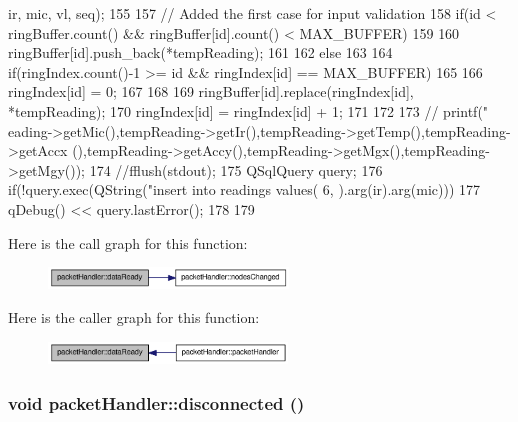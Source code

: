 \begin{DoxyCode}
{      ir, mic, vl, seq);
155 
157       // Added the first case for input validation
158       if(id < ringBuffer.count() && ringBuffer[id].count() < MAX_BUFFER)
159       {
160         ringBuffer[id].push_back(*tempReading);
161       }
162       else
163       {
164         if(ringIndex.count()-1 >= id && ringIndex[id] == MAX_BUFFER)
165           {
166               ringIndex[id] = 0;
167           }
168 
169           ringBuffer[id].replace(ringIndex[id], *tempReading);
170           ringIndex[id] = ringIndex[id] + 1;
171       }
172 
173 //      printf("%
      eading->getMic(),tempReading->getIr(),tempReading->getTemp(),tempReading->getAccx
      (),tempReading->getAccy(),tempReading->getMgx(),tempReading->getMgy());
174       //fflush(stdout);
175         QSqlQuery query;
176         if(!query.exec(QString("insert into readings values(%
      6, %
      ).arg(ir).arg(mic)))
177             qDebug() << query.lastError();
178 
179 }
\end{DoxyCode}




Here is the call graph for this function:\nopagebreak
\begin{figure}[H]
\begin{center}
\leavevmode
\includegraphics[width=181pt]{classpacketHandler_a9085a61a51eccc7acb240a7b68601686_cgraph}
\end{center}
\end{figure}




Here is the caller graph for this function:\nopagebreak
\begin{figure}[H]
\begin{center}
\leavevmode
\includegraphics[width=180pt]{classpacketHandler_a9085a61a51eccc7acb240a7b68601686_icgraph}
\end{center}
\end{figure}


\hypertarget{classpacketHandler_a43223a8930a6af8c40c5889d8e4b9d4b}{
\subsubsection[{disconnected}]{\setlength{\rightskip}{0pt plus 5cm}void packetHandler::disconnected ()}}
\label{classpacketHandler_a43223a8930a6af8c40c5889d8e4b9d4b}


